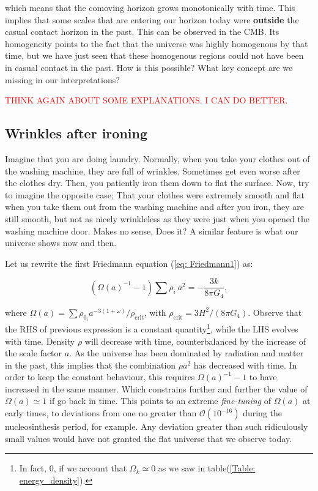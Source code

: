 \documentclass[11pt, a4paper]{article} %
\begin{document}
which means that the comoving horizon grows monotonically with time. This implies that some scales that are entering our horizon today were \textbf{outside} the casual contact horizon in the past. This can be observed in the CMB. Its homogeneity points to the fact that the universe was highly homogenous by that time, but we have just seen that these homogenous regions could not have been in casual contact in the past. How is this possible? What key concept are we missing in our interpretations?

\textcolor{red}{THINK AGAIN ABOUT SOME EXPLANATIONS. I CAN DO BETTER.}

\subsection*{Wrinkles after ironing}

Imagine that you are doing laundry. Normally, when you take your clothes out of the washing machine, they are full of wrinkles. Sometimes get even worse after the clothes dry. Then, you patiently iron them down to flat the surface. Now, try to imagine the opposite case; That your clothes were extremely smooth and flat when you take them out from the washing machine and after you iron, they are still smooth, but not as nicely wrinkleless as they were just when you opened the washing machine door. Makes no sense, Does it? A similar feature is what our universe shows now and then.

Let us rewrite the first Friedmann equation (\ref{eq: Friedmann1}) as:

\begin{equation}\label{eq: divergence_Friedmann}
	\left(\Omega(a)^{-1} - 1\right) \sum \rho_{i} \: a^{2} = -\frac{3k}{8 \pi G_{4}},
\end{equation}

where $\Omega(a) = \sum \rho_{0_{i}} a^{-3(1+\omega)}/\rho_{\text{crit}}$, with $\rho_{\text{crit}} = 3 H^{2}/(8 \pi G_{4})$. Observe that the RHS of previous expression is a constant quantity\footnote{In fact, 0, if we account that $\Omega_{k} \simeq 0$ as we saw in table(\ref{Table: energy_density}).}, while the LHS evolves with time. Density $\rho$ will decrease with time, counterbalanced by the increase of the scale factor $a$. As the universe has been dominated by radiation and matter in the past, this implies that the combination $\rho a^{2}$ has decreased with time. In order to keep the constant behaviour, this requires $\Omega(a)^{-1} -1$ to have increased in the same manner. Which constrains further and further the value of $\Omega(a) \simeq 1$ if go back in time. This points to an extreme \textit{fine-tuning} of $\Omega(a)$ at early times, to deviations from one no greater than $\mathcal{O}(10^{-16})$ during the nucleosinthesis period, for example. Any deviation greater than such ridiculously small values would have not granted the flat universe that we observe today.
\vspace{1cm}
\end{document}
